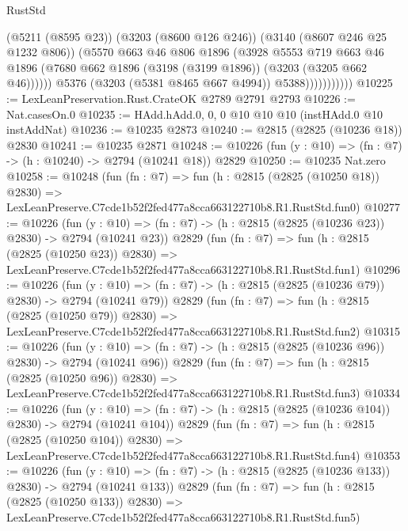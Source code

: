 \begin{lexlean}{RustStd}
\begin{coremodule}
                            (@5211 (@8595 @23))
                            (@3203 (@8600 @126 @246))
                            (@3140 (@8607 @246 @25 @1232 @806))
                            (@5570
                              @663
                              @46
                              @806
                              @1896
                              (@3928
                                @5553
                                @719
                                @663
                                @46
                                @1896
                                (@7680 @662 @1896 (@3198 (@3199 @1896)) (@3203 (@3205 @662 @46))))))
                          @5376
                          (@3203 (@5381 @8465 @667 @4994))
                          @5388)))))))))))
@10225 := LexLeanPreservation.Rust.CrateOK @2789 @2791 @2793
@10226 := Nat.casesOn.{0}
@10235 := HAdd.hAdd.{0, 0, 0} @10 @10 @10 (instHAdd.{0} @10 instAddNat)
@10236 := @10235 @2873
@10240 := @2815 (@2825 (@10236 @18)) @2830
@10241 := @10235 @2871
@10248 := @10226 (fun (y : @10) => (fn : @7) -> (h : @10240) -> @2794 (@10241 @18)) @2829
@10250 := @10235 Nat.zero
@10258 := @10248
    (fun (fn : @7) =>
    fun (h : @2815 (@2825 (@10250 @18)) @2830) =>
    LexLeanPreserve.C7cde1b52f2fed477a8cca663122710b8.R1.RustStd.fun0)
@10277 := @10226
    (fun (y : @10) => (fn : @7) -> (h : @2815 (@2825 (@10236 @23)) @2830) -> @2794 (@10241 @23))
    @2829
    (fun (fn : @7) =>
    fun (h : @2815 (@2825 (@10250 @23)) @2830) =>
    LexLeanPreserve.C7cde1b52f2fed477a8cca663122710b8.R1.RustStd.fun1)
@10296 := @10226
    (fun (y : @10) => (fn : @7) -> (h : @2815 (@2825 (@10236 @79)) @2830) -> @2794 (@10241 @79))
    @2829
    (fun (fn : @7) =>
    fun (h : @2815 (@2825 (@10250 @79)) @2830) =>
    LexLeanPreserve.C7cde1b52f2fed477a8cca663122710b8.R1.RustStd.fun2)
@10315 := @10226
    (fun (y : @10) => (fn : @7) -> (h : @2815 (@2825 (@10236 @96)) @2830) -> @2794 (@10241 @96))
    @2829
    (fun (fn : @7) =>
    fun (h : @2815 (@2825 (@10250 @96)) @2830) =>
    LexLeanPreserve.C7cde1b52f2fed477a8cca663122710b8.R1.RustStd.fun3)
@10334 := @10226
    (fun (y : @10) => (fn : @7) -> (h : @2815 (@2825 (@10236 @104)) @2830) -> @2794 (@10241 @104))
    @2829
    (fun (fn : @7) =>
    fun (h : @2815 (@2825 (@10250 @104)) @2830) =>
    LexLeanPreserve.C7cde1b52f2fed477a8cca663122710b8.R1.RustStd.fun4)
@10353 := @10226
    (fun (y : @10) => (fn : @7) -> (h : @2815 (@2825 (@10236 @133)) @2830) -> @2794 (@10241 @133))
    @2829
    (fun (fn : @7) =>
    fun (h : @2815 (@2825 (@10250 @133)) @2830) =>
    LexLeanPreserve.C7cde1b52f2fed477a8cca663122710b8.R1.RustStd.fun5)

\end{coremodule}
\end{lexlean}
